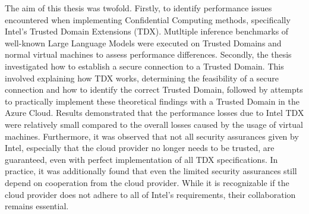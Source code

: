 
\Abstract
The aim of this thesis was twofold. Firstly, to identify performance issues encountered when implementing Confidential Computing methods, specifically Intel's Trusted Domain Extensions (TDX). Mutltiple inference benchmarks of well-known Large Language Models were executed on Trusted Domains and normal virtual machines to assess performance differences. Secondly, the thesis investigated how to establish a secure connection to a Trusted Domain. This involved explaining how TDX works, determining the feasibility of a secure connection and how to identify the correct Trusted Domain, followed by attempts to practically implement these theoretical findings with a Trusted Domain in the Azure Cloud. Results demonstrated that the performance losses due to Intel TDX were relatively small compared to the overall losses caused by the usage of virtual machines. Furthermore, it was observed that not all security assurances given by Intel, especially that the cloud provider no longer needs to be trusted, are guaranteed, even with perfect implementation of all TDX specifications. In practice, it was additionally found that even the limited security assurances still depend on cooperation from the cloud provider. While it is recognizable if the cloud provider does not adhere to all of Intel's requirements, their collaboration remains essential.